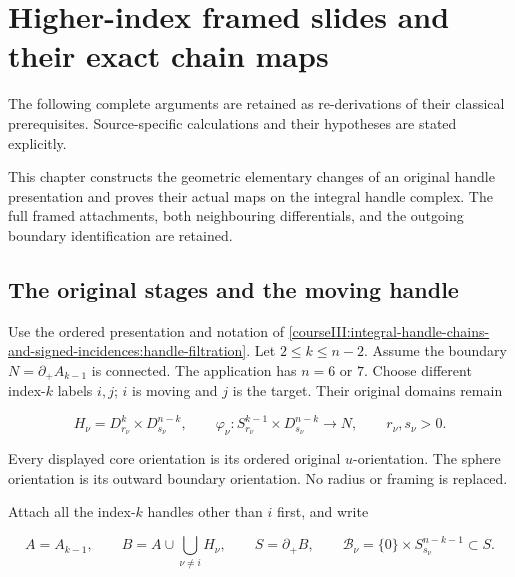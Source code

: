 \section{Higher-index framed slides and their exact chain maps}\label{courseIII:higher-index-framed-slides-and-chain-maps:section}

The following complete arguments are retained as re-derivations of their classical prerequisites. Source-specific calculations and their hypotheses are stated explicitly.

This chapter constructs the geometric elementary changes of an original handle presentation and proves their actual maps on the integral handle complex. The full framed attachments, both neighbouring differentials, and the outgoing boundary identification are retained.

\subsection{The original stages and the moving handle}
\label{courseIII:higher-index-framed-slides-and-chain-maps:higher-slide-stages}

\label{courseIII:higher-index-framed-slides-and-chain-maps:section-1}\label{courseIII:higher-slides:1}

Use the ordered presentation and notation of \cref{courseIII:integral-handle-chains-and-signed-incidences:handle-filtration}. Let \(2\leq k\leq n-2\). Assume the boundary \(N=\partial_+A_{k-1}\) is connected. The application has \(n=6\) or \(7\). Choose different index-\(k\) labels \(i,j\); \(i\) is moving and \(j\) is the target. Their original domains remain

\begin{equation}
H_\nu=D^k_{r_\nu}\times D^{n-k}_{s_\nu},
 \qquad
 \varphi_\nu:S^{k-1}_{r_\nu}\times D^{n-k}_{s_\nu}\longrightarrow N,
 \qquad r_\nu,s_\nu>0.
 \label{courseIII:higher-index-framed-slides-and-chain-maps:eq:1.1}
\end{equation}

Every displayed core orientation is its ordered original \(u\)-orientation. The sphere orientation is its outward boundary orientation. No radius or framing is replaced.

Attach all the index-\(k\) handles other than \(i\) first, and write

\begin{equation}
A=A_{k-1},\qquad
 B=A\cup\bigcup_{\nu\ne i}H_\nu,\qquad
 S=\partial_+B,\qquad
 \mathcal B_\nu=\{0\}\times S^{n-k-1}_{s_\nu}\subset S .
 \label{courseIII:higher-index-framed-slides-and-chain-maps:eq:1.2}
\end{equation}


